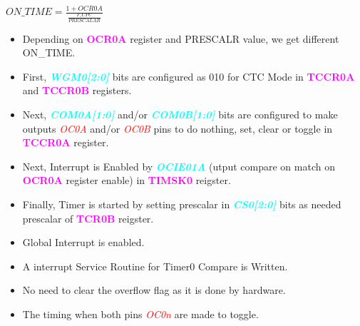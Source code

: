 \documentclass{article}
\newcommand{\bitFormat}[1]{\emph{\textbf{\textcolor{cyan}{#1}}}}
\newcommand{\regFormat}[1]{\textbf{\textcolor{magenta}{#1}}}
\newcommand{\pinFormat}[1]{\emph{\textcolor{red}{#1}}}
\begin{document}
\begin{center}
    $ON\_TIME = \frac{1 + OCR0A}{\frac{F\_CPU}{PRESCALAR}}$
\end{center}
\begin{itemize}
    \item Depending on \regFormat{OCR0A} register and PRESCALR value, we get different ON\_TIME.
    \item First, \bitFormat{WGM0[2:0]} bits are configured as 010 for CTC Mode in \regFormat{TCCR0A} and \regFormat{TCCR0B} registers.
    \item Next, \bitFormat{COM0A[1:0]} and/or \bitFormat{COM0B[1:0]} bits are configured to make outputs \pinFormat{OC0A} and/or \pinFormat{OC0B} pins to do nothing, set, clear or toggle in \regFormat{TCCR0A} register.
    \item Next, Interrupt is Enabled by \bitFormat{OCIE01A} (utput compare on match on \regFormat{OCR0A} register enable) in \regFormat{TIMSK0} reigster.
    \item Finally, Timer is started by setting prescalar in \bitFormat{CS0[2:0]} bits as needed prescalar of \regFormat{TCR0B} reigster.
    \item Global Interrupt is enabled.
    \item A interrupt Service Routine for Timer0 Compare is Written.
    \item No need to clear the overflow flag as it is done by hardware.
    \item The timing when both pins \pinFormat{OC0n} are made to toggle.
\end{itemize}
\end{document}
